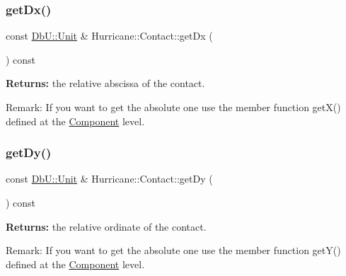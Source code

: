 \subsubsection{\texorpdfstring{get\+Dx()}{getDx()}}
{\footnotesize\ttfamily const \mbox{\hyperlink{group__DbUGroup_ga4fbfa3e8c89347af76c9628ea06c4146}{Db\+U\+::\+Unit}} \& Hurricane\+::\+Contact\+::get\+Dx (\begin{DoxyParamCaption}{ }\end{DoxyParamCaption}) const\hspace{0.3cm}{\ttfamily [inline]}}

{\bfseries Returns\+:} the relative abscissa of the contact.

\begin{DoxyParagraph}{Remark\+: If you want to get the absolute one use the member function }
get\+X() defined at the \mbox{\hyperlink{classHurricane_1_1Component}{Component}} level. 
\end{DoxyParagraph}
\mbox{\label{classHurricane_1_1Contact_aa7bc32ab9211fd5f6ad3aacdf1214f20}} 
\subsubsection{\texorpdfstring{get\+Dy()}{getDy()}}
{\footnotesize\ttfamily const \mbox{\hyperlink{group__DbUGroup_ga4fbfa3e8c89347af76c9628ea06c4146}{Db\+U\+::\+Unit}} \& Hurricane\+::\+Contact\+::get\+Dy (\begin{DoxyParamCaption}{ }\end{DoxyParamCaption}) const\hspace{0.3cm}{\ttfamily [inline]}}

{\bfseries Returns\+:} the relative ordinate of the contact.

\begin{DoxyParagraph}{Remark\+: If you want to get the absolute one use the member function }
get\+Y() defined at the \mbox{\hyperlink{classHurricane_1_1Component}{Component}} level. 
\end{DoxyParagraph}
\mbox{\label{classHurricane_1_1Contact_a28bd18de9ca6e5cf2b77fce5e22af43a}} 
